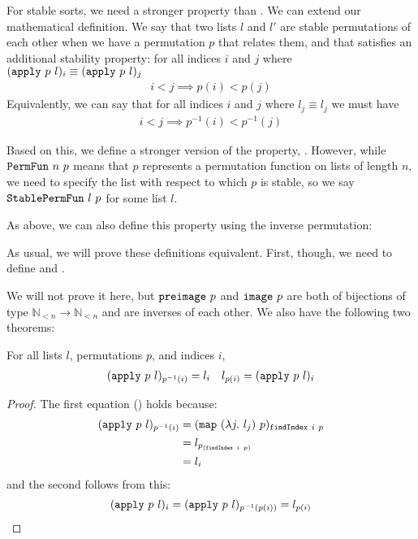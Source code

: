 \documentclass[sigplan,10pt,anonymous,review]{thesis}
\begin{document}
For stable sorts, we need a stronger property than .
We can extend our mathematical definition. We say that two lists $l$
and $l'$ are stable permutations of each other when we have a
permutation $p$ that relates them, and that satisfies an additional
stability property: for all indices $i$ and $j$ where
$(\texttt{apply}~p~l)_i \equiv (\texttt{apply}~p~l)_j$
\begin{gather*}
  i < j \implies p(i) < p(j)
\end{gather*}
Equivalently, we can say that for all indices $i$ and $j$ where $l_j \equiv
l_j$ we must have
\begin{gather*}
  i < j \implies p^{-1}(i) < p^{-1}(j)
\end{gather*}

Based on this, we define a stronger version of the 
property, . However, while $\texttt{PermFun}~n~p$
means that $p$ represents a permutation function on lists of length
$n$, we need to specify the list with respect to which $p$ is stable,
so we say $\texttt{StablePermFun}~l~p$ for some list $l$.

As above, we can also define this
property using the inverse permutation:

As usual, we will prove these
definitions equivalent. First, though, we need to define 
and .

We will not prove
it here, but $\texttt{preimage}~p$ and $\texttt{image}~p$ are both of
bijections of type $\mathbb{N}_{<n} \to \mathbb{N}_{<n}$ and are
inverses of each other. We also have the following two theorems:
\begin{theorem}
  For all lists $l$, permutations $p$, and indices $i$,
  \begin{align*}
    (\texttt{apply}~p~l)_{p^{-1}(i)} = l_i && l_{p(i)} = (\texttt{apply}~p~l)_i
  \end{align*}
\end{theorem}
\begin{proof}
  The first equation () holds because:
  \begin{align*}
       (\texttt{apply}~p~l)_{p^{-1}(i)}
    &= (\texttt{map}~(\lambda j.~l_j)~p)_{\texttt{findIndex}~i~p} \\
    &= l_{p_{(\texttt{findIndex}~i~p)}} \\
    &= l_i
  \end{align*}
  and the second follows from this:
  \begin{equation*}
      (\texttt{apply}~p~l)_i
    = (\texttt{apply}~p~l)_{p^{-1}(p(i))}
    = l_{p(i)}
    \qedhere
  \end{equation*}
\end{proof}
\end{document}
